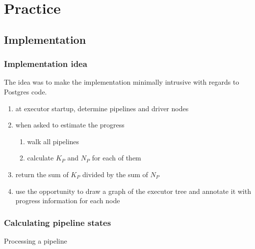 \documentclass{beamer}
\begin{document}
\section{Practice}
\subsection{Implementation}

\begin{frame}
  \frametitle{Implementation idea}

  The idea was to make the implementation minimally intrusive with regards to
  Postgres code.

  \begin{enumerate}
  \item at executor startup, determine pipelines and driver nodes
  \item when asked to estimate the progress
    \begin{enumerate}
    \item walk all pipelines
    \item calculate $K_{P}$ and $N_{P}$ for each of them
    \end{enumerate}
  \item return the sum of $K_{P}$ divided by the sum of $N_{P}$
  \item use the opportunity to draw a graph of the executor tree and annotate
    it with progress information for each node
  \end{enumerate}
\end{frame}

\begin{frame}[fragile]
  \frametitle{Calculating pipeline states}

\begin{block}{Processing a pipeline}
\begin{semiverbatim}
\end{semiverbatim}
\end{block}
\end{frame}
\end{document}
